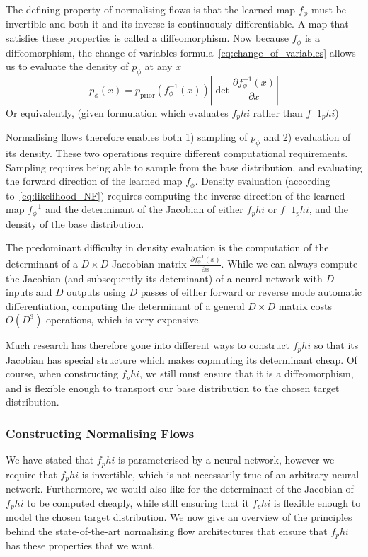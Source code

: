 \documentclass[12pt,a4paper]{report}
\begin{document}
The defining property of normalising flows is that the learned map $f_\phi$ must be invertible and both it and its inverse is continuously differentiable. 
A map that satisfies these properties is called a diffeomorphism. 
Now because $f_\phi$ is a diffeomorphism, the change of variables formula~\ref{eq:change_of_variables} allows us to evaluate the density of $p_\phi$ at any $x$ 
\begin{equation}
\label{eq:likelihood_NF}
    p_\phi(x) = p_{\text{prior}}(f_\phi^{-1}(x)) \left| \det \frac{\partial f_\phi^{-1}(x)}{\partial x} \right|
\end{equation}
Or equivalently, (given formulation which evaluates $f_phi$ rather than $f^-1_phi$)

Normalising flows therefore enables both 1) sampling of $p_\phi$ and 2) evaluation of its density. 
These two operations require different computational requirements. Sampling requires being able to sample from the base distribution, and evaluating the forward direction of the learned map $f_\phi$. 
Density evaluation (according to~\ref{eq:likelihood_NF}) requires computing the inverse direction of the learned map $f^{-1}_\phi$ and the determinant of the Jacobian of either $f_phi$ or $f^-1_phi$, and the density of the base distribution. 

The predominant difficulty in density evaluation is the computation of the determinant of a $D \times D$ Jaccobian matrix $\frac{\partial f_\phi^{-1}(x)}{\partial x}$. 
While we can always compute the Jacobian (and subsequently its deteminant) of a neural network with $D$ inputs and $D$ outputs using $D$ passes of either forward or reverse mode automatic differentiation, computing the determinant of a general $D \times D$ matrix costs $O(D^3)$ operations, which is very expensive.

Much research has therefore gone into different ways to construct $f_phi$ so that its Jacobian has special structure which makes copmuting its determinant cheap. Of course, when constructing $f_phi$, we still must ensure that it is a diffeomorphism, and is flexible enough to transport our base distribution to the chosen target distribution. 

\subsubsection{Constructing Normalising Flows}
We have stated that $f_phi$ is parameterised by a neural network, however we require that $f_phi$ is invertible, which is not necessarily true of an arbitrary neural network. Furthermore, we would also like for the determinant of the Jacobian of $f_phi$ to be computed cheaply, while still ensuring that it $f_phi$ is flexible enough to model the chosen target distribution. We now give an overview of the principles behind the state-of-the-art normalising flow architectures that ensure that $f_phi$ has these properties that we want. 
\end{document}
